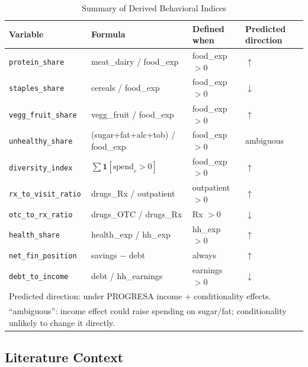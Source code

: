 \begin{table}[h!]
\centering
\caption{Summary of Derived Behavioral Indices}
\label{tab:derived_indices}
\small
\begin{tabular}{llll}
\hline\hline
Variable & Formula & Defined when & Predicted direction \\
\hline
\texttt{protein\_share}    & meat\_dairy / food\_exp     & food\_exp $> 0$ & $\uparrow$ \\
\texttt{staples\_share}    & cereals / food\_exp          & food\_exp $> 0$ & $\downarrow$ \\
\texttt{vegg\_fruit\_share}& vegg\_fruit / food\_exp      & food\_exp $> 0$ & $\uparrow$ \\
\texttt{unhealthy\_share}  & (sugar+fat+alc+tob) / food\_exp & food\_exp $> 0$ & ambiguous \\
\texttt{diversity\_index}  & $\sum \mathbf{1}[\text{spend}_c > 0]$ & food\_exp $> 0$ & $\uparrow$ \\[3pt]
\texttt{rx\_to\_visit\_ratio} & drugs\_Rx / outpatient  & outpatient $> 0$ & $\uparrow$ \\
\texttt{otc\_to\_rx\_ratio}   & drugs\_OTC / drugs\_Rx  & Rx $> 0$         & $\downarrow$ \\
\texttt{health\_share}        & health\_exp / hh\_exp   & hh\_exp $> 0$    & $\uparrow$ \\[3pt]
\texttt{net\_fin\_position} & savings $-$ debt          & always           & $\uparrow$ \\
\texttt{debt\_to\_income}   & debt / hh\_earnings       & earnings $> 0$   & $\downarrow$ \\
\hline\hline
\multicolumn{4}{l}{\footnotesize Predicted direction: under PROGRESA income + conditionality effects.}\\
\multicolumn{4}{l}{\footnotesize ``ambiguous'': income effect could raise spending on sugar/fat; conditionality unlikely to change it directly.}
\end{tabular}
\end{table}

\subsection{Literature Context}
\label{app:enigh_lit}

